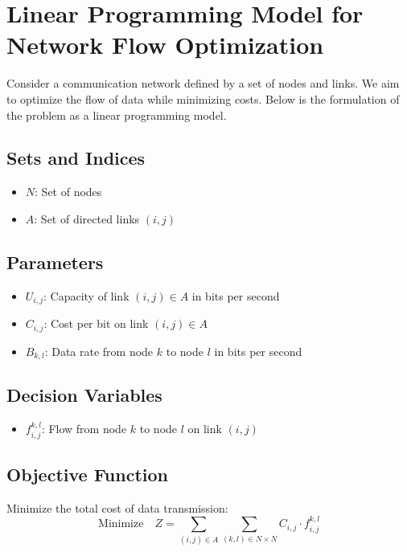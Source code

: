 \documentclass{article}
\begin{document}
\section*{Linear Programming Model for Network Flow Optimization}

Consider a communication network defined by a set of nodes and links. We aim to optimize the flow of data while minimizing costs. Below is the formulation of the problem as a linear programming model.

\subsection*{Sets and Indices}
\begin{itemize}
    \item \( N \): Set of nodes
    \item \( A \): Set of directed links \((i, j)\)
\end{itemize}

\subsection*{Parameters}
\begin{itemize}
    \item \( U_{i,j} \): Capacity of link \((i, j) \in A\) in bits per second
    \item \( C_{i,j} \): Cost per bit on link \((i, j) \in A\)
    \item \( B_{k,l} \): Data rate from node \( k \) to node \( l \) in bits per second
\end{itemize}

\subsection*{Decision Variables}
\begin{itemize}
    \item \( f_{i,j}^{k,l} \): Flow from node \( k \) to node \( l \) on link \((i, j)\)
\end{itemize}

\subsection*{Objective Function}
Minimize the total cost of data transmission:
\[
\text{Minimize} \quad Z = \sum_{(i,j) \in A} \sum_{(k,l) \in N \times N} C_{i,j} \cdot f_{i,j}^{k,l}
\]
\end{document}
